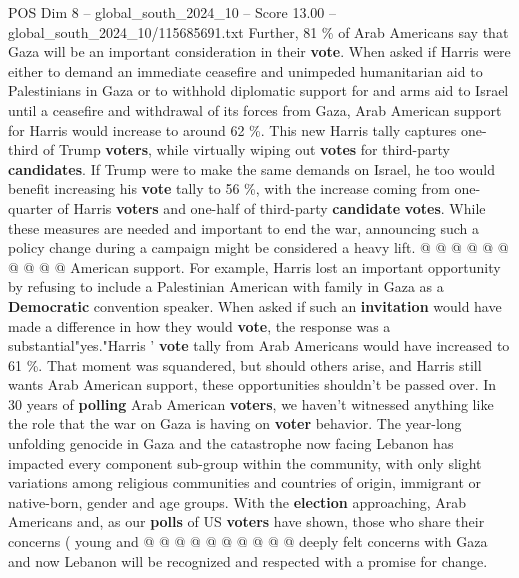 \begin{textsample}{POS Dim 8 – global\_south\_2024\_10 – Score 13.00 – global\_south\_2024\_10/115685691.txt}
Further, 81 \% of Arab Americans say that Gaza will be an important consideration in their \textbf{vote}.
When asked if Harris were either to demand an immediate ceasefire and unimpeded humanitarian aid to Palestinians in Gaza or to withhold diplomatic support for and arms aid to Israel until a ceasefire and withdrawal of its forces from Gaza, Arab American support for Harris would increase to around 62 \%.
This new Harris tally captures one-third of Trump \textbf{voters}, while virtually wiping out \textbf{votes} for third-party \textbf{candidates}.
If Trump were to make the same demands on Israel, he too would benefit increasing his \textbf{vote} tally to 56 \%, with the increase coming from one-quarter of Harris \textbf{voters} and one-half of third-party \textbf{candidate} \textbf{votes}.
While these measures are needed and important to end the war, announcing such a policy change during a campaign might be considered a heavy lift. @ @ @ @ @ @ @ @ @ @ American support.
For example, Harris lost an important opportunity by refusing to include a Palestinian American with family in Gaza as a \textbf{Democratic} convention speaker.
When asked if such an \textbf{invitation} would have made a difference in how they would \textbf{vote}, the response was a substantial"yes."Harris ' \textbf{vote} tally from Arab Americans would have increased to 61 \%.
That moment was squandered, but should others arise, and Harris still wants Arab American support, these opportunities shouldn't be passed over.
In 30 years of \textbf{polling} Arab American \textbf{voters}, we haven't witnessed anything like the role that the war on Gaza is having on \textbf{voter} behavior.
The year-long unfolding genocide in Gaza and the catastrophe now facing Lebanon has impacted every component sub-group within the community, with only slight variations among religious communities and countries of origin, immigrant or native-born, gender and age groups.
With the \textbf{election} approaching, Arab Americans and, as our \textbf{polls} of US \textbf{voters} have shown, those who share their concerns ( young and @ @ @ @ @ @ @ @ @ @ deeply felt concerns with Gaza and now Lebanon will be recognized and respected with a promise for change.

\end{textsample}
